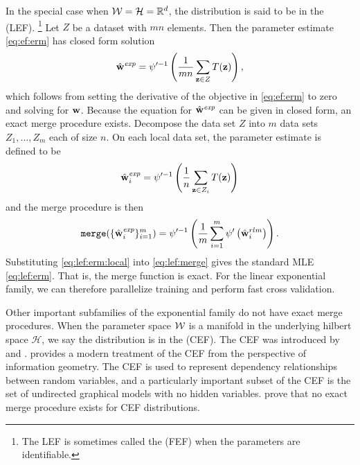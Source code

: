 \documentclass[thesis.tex]{subfiles}
\newcommand{\set}[1]{\mathcal {#1}}
\newcommand{\merge}{\mkprocedure{merge}}
\newcommand{\wexp}{\hat\w^\textit{exp}}
\begin{document}
In the special case when $\W=\set H=\R^d$,
the distribution is said to be in the  (LEF).%
\footnote{The LEF is sometimes called the  (FEF) when the parameters are identifiable.}
Let $Z$ be a dataset with $mn$ elements.
Then the parameter estimate \eqref{eq:ef:erm} has closed form solution
\begin{equation}
    \label{eq:lef:erm}
    \wexp
    = \psi'^{-1} \left(\frac{1}{mn} \sum_{\z\in Z} T(\z) \right)
    ,
\end{equation}
which follows from setting the derivative of the objective in \eqref{eq:ef:erm} to zero and solving for $\mathbf w$.
Because the equation for $\wexp$ can be given in closed form,
an exact merge procedure exists.
Decompose the data set $Z$ into $m$ data sets $Z_1,...,Z_m$ each of size $n$.
On each local data set, the parameter estimate is defined to be
\begin{equation}
    \label{eq:lef:erm:local}
    \wexp_i
    = \psi'^{-1} \left(\frac{1}{n} \sum_{\z\in Z_i} T(\z) \right)
\end{equation}
and the merge procedure is then
\begin{equation}
    \label{eq:lef:merge}
    \merge(\{\wexp_i\}_{i=1}^m)
    =
    \psi'^{-1} 
    \left(
        \frac{1}{m} \sum_{i=1}^m \psi' \left(\wrlm_i\right)
    \right)
    .
\end{equation}
Substituting \eqref{eq:lef:erm:local} into \eqref{eq:lef:merge} gives the standard MLE \eqref{eq:lef:erm}.
That is, the merge function is exact.
For the linear exponential family, 
we can therefore parallelize training and perform fast cross validation.

Other important subfamilies of the exponential family do not have exact merge procedures.
When the parameter space ${\mathcal W}$ is a manifold in the underlying hilbert space $\set H$,
we say the distribution is in the  (CEF). 
The CEF was introduced by \citet{efron1975defining} and \citet{amari1982differential}.
\citet{amari2016information} provides a modern treatment of the CEF from the perspective of information geometry.
The CEF is used to represent dependency relationships between random variables,
and a particularly important subset of the CEF is the set of undirected graphical models with no hidden variables.
\citet{liu2012distributed} prove that no exact merge procedure exists for CEF distributions.
\end{document}
